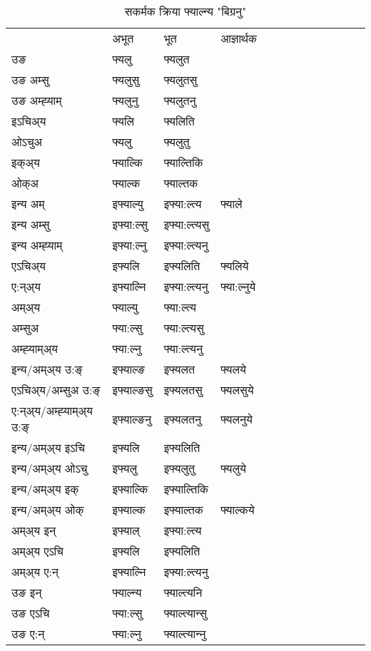 \begin{table}[H]
\centering
\caption{\label{ɛl.vt} सकर्मक क्रिया  फ्याल्न्य  "बिग्रनु"  }
\begin{tabular}{l|l|l|l|l|l|l|l|l|l|l|l|l}  \toprule
&अभूत & भूत & आज्ञार्थक \\ 
उङ &फ्यलु &फ्यलुत \\ 
उङ अम्सु &फ्यलुसु &फ्यलुतसु \\ 
उङ अम्ह्‍याम् &फ्यलुनु &फ्यलुतनु \\ 
इऽचिअ्य &फ्यलि &फ्यलिति   \\ 
ओऽचुअ &फ्यलु &फ्यलुतु   \\ 
इक्अ्य &फ्याल्कि &फ्याल्तिकि   \\ 
ओक्अ &फ्याल्क &फ्याल्तक   \\ 
इन्य अम् & इफ्याल्यु  & इफ्या:ल्त्य &फ्याले  \\ 
इन्य अम्सु & इफ्या:ल्सु  & इफ्या:ल्त्यसु   \\ 
इन्य अम्ह्‍याम् & इफ्या:ल्नु  & इफ्या:ल्त्यनु   \\ 
एऽचिअ्य & इफ्यलि & इफ्यलिति &फ्यलिये    \\ 
ए:न्अ्य & इफ्याल्नि  & इफ्या:ल्त्यनु &फ्या:ल्नुये  \\ 
अम्अ्य & फ्याल्यु  & फ्या:ल्त्य  \\ 
अम्सुअ & फ्या:ल्सु & फ्या:ल्त्यसु  \\ 
अम्ह्‍याम्अ्य & फ्या:ल्नु  & फ्या:ल्त्यनु \\ 
\midrule
इन्य/अम्अ्य उ:ङ्‌&इफ्याल्ङ & इफ्यलत &फ्यलये \\ 
एऽचिअ्य/अम्सुअ उ:ङ्‌ &इफ्याल्ङसु & इफ्यलतसु &फ्यलसुये \\ 
ए:न्अ्य/अम्ह्‍याम्अ्य उ:ङ्‌ &इफ्याल्ङनु & इफ्यलतनु &फ्यलनुये \\ 
इन्य/अम्अ्य इऽचि & इफ्यलि & इफ्यलिति    \\ 
इन्य/अम्अ्य ओऽचु & इफ्यलु & इफ्यलुतु  &फ्यलुये  \\ 
इन्य/अम्अ्य इक् & इफ्याल्कि & इफ्याल्तिकि   \\ 
इन्य/अम्अ्य ओक् & इफ्याल्क & इफ्याल्तक  &फ्याल्कये  \\ 
अम्अ्य इन् & इफ्याल् & इफ्या:ल्त्य   \\ 
अम्अ्य एऽचि & इफ्यलि & इफ्यलिति    \\ 
अम्अ्य ए:न् & इफ्याल्नि  & इफ्या:ल्त्यनु  \\ 
\midrule
उङ इन् & फ्याल्न्य  & फ्याल्त्यनि  \\ 
उङ एऽचि & फ्या:ल्सु  & फ्याल्त्यान्सु   \\ 
उङ ए:न्& फ्या:ल्नु  & फ्याल्त्यान्‍नु   \\ 
\bottomrule
\end{tabular}
\end{table}


